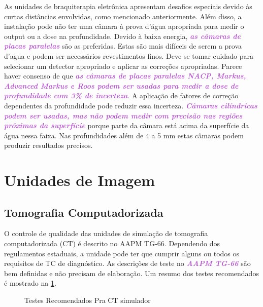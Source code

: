 \documentclass[11pt,a4paper]{article}
\begin{document}
	As unidades de braquiterapia eletrônica apresentam desafios especiais devido às curtas distâncias envolvidas, como mencionado anteriormente. Além disso, a instalação pode não ter uma câmara à prova d'água apropriada para medir o output ou a dose na profundidade. Devido à baixa energia, \textcolor{MediumOrchid}{\textbf{\textit{as câmaras de placas paralelas}}} são as preferidas. Estas são mais difíceis de serem a prova d'agua e podem ser necessários revestimentos finos. Deve-se tomar cuidado para selecionar um detector apropriado e aplicar as correções apropriadas. Parece haver consenso de que \textcolor{MediumOrchid}{\textbf{\textit{as câmaras de placas paralelas NACP, Markus, Advanced Markus e Roos podem ser usadas para medir a dose de profundidade com 3\% de incerteza}}}. A aplicação de fatores de correção dependentes da profundidade pode reduzir essa incerteza. \textcolor{MediumOrchid}{\textbf{\textit{Câmaras cilíndricas podem ser usadas, mas não podem medir com precisão nas regiões próximas da superfície}}} porque parte da câmara está acima da superfície da água nessa faixa. Nas profundidades além de 4 a 5 mm estas câmaras podem produzir resultados precisos.

\section{Unidades de Imagem}

\subsection*{Tomografia Computadorizada}

	O controle de qualidade das unidades de simulação de tomografia computadorizada (CT) é descrito no AAPM TG-66. Dependendo dos regulamentos estaduais, a unidade pode ter que cumprir alguns ou todos os requisitos de TC de diagnóstico. As descrições de teste no \textcolor{MediumOrchid}{\textbf{\textit{AAPM TG-66}}} são bem definidas e não precisam de elaboração. Um resumo dos testes recomendados é mostrado na \ref{fig:qaCtSimulador}.

	\begin{figure}[!h]
		\centering
		\caption{Testes Recomendados Pra CT simulador}
		\label{fig:qaCtSimulador}
	\end{figure}
\end{document}
